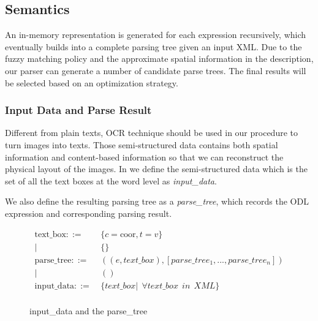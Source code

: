 \subsection{Semantics}
\label{sec:semantics}
An in-memory representation is generated for each expression recursively, 
which eventually builds into a complete parsing tree given an input XML.
Due to the fuzzy matching policy and the approximate spatial information
in the description, our parser can generate a number of candidate parse
trees.  The final results will be selected based on an optimization strategy.

\subsubsection{Input Data and Parse Result}
Different from plain texts, OCR technique should be used in our procedure to 
turn images into texts. Those semi-structured data contains both spatial information and content-based information so that we can reconstruct the physical 
	layout of the images. 
In  we define the semi-structured data which is the set of all the text boxes at the word level as {\em input\_data}. 
 
We also define the resulting parsing tree as a {\em parse\_tree}, 
which records the ODL expression and corresponding parsing result.
\begin{figure}[ht!]
\centering
\begin{align*}
		   \text{text\_box} ::=~&\{c=\text{coor}, t=v\}\\
		   |~& \{\}\\
		   \text{parse\_tree} ::=~&((e,text\_box), [parse\_tree_1,...,parse\_tree_n])\\
		   |~& ()\\
\text{input\_data} ::=~&\{text\_box | ~~ \forall text\_box ~~in ~~XML\}\\
\end{align*}
\caption{input\_data and the parse\_tree}
\label{fig:data}
\end{figure}
